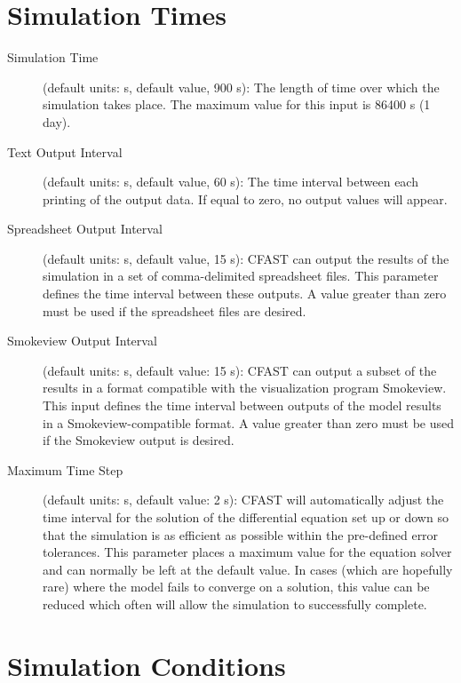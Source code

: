 \section{Simulation Times}
\label{info:TIME}

\begin{description}
\item[Simulation Time] (default units: s, default value, 900 s): The length of time over which the simulation takes place. The maximum value for this input is 86400 s (1 day).

\item[Text Output Interval] (default units: s, default value, 60 s): The time interval between each printing of the output data.  If equal to zero, no output values will appear.

\item[Spreadsheet Output Interval] (default units: s, default value, 15 s): CFAST can output the results of the simulation in a set of comma-delimited spreadsheet files. This parameter defines the time interval between these outputs. A value greater than zero must be used if the spreadsheet files are desired.

\item[Smokeview Output Interval] (default units: s, default value: 15 s): CFAST can output a subset of the results in a format compatible with the visualization program Smokeview. This input defines the time interval between outputs of the model results in a Smokeview-compatible format.  A value greater than zero must be used if the Smokeview output is desired.

\item[Maximum Time Step] (default units: s, default value: 2 s): CFAST will automatically adjust the time interval for the solution of the differential equation set up or down so that the simulation is as efficient as possible within the pre-defined error tolerances. This parameter places a maximum value for the equation solver and can normally be left at the default value. In cases (which are hopefully rare) where the model fails to converge on a solution, this value can be reduced which often will allow the simulation to successfully complete.
\end{description}




\section{Simulation Conditions}
\label{info:INIT}

